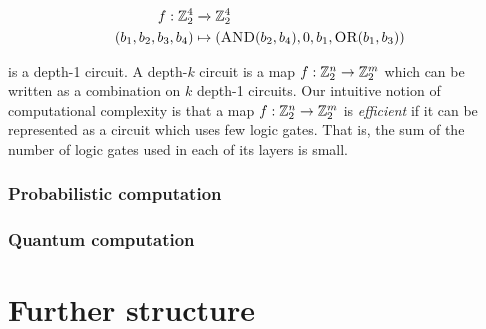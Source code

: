\documentclass{article}
\theoremstyle{definition}
\numberwithin{figure}{section}
\begin{document}
\begin{align*}
f:\mathbb{Z}_2^4&\xrightarrow{} \mathbb{Z}_2^4\\
(b_1,b_2,b_3,b_4)&\mapsto (\text{\scshape AND\normalfont}(b_2,b_4), 0, b_1, \text{\scshape OR\normalfont}(b_1,b_3))
\end{align*}

is a depth-1 circuit. A depth-$k$ circuit is a map $f:\mathbb{Z}_2^n\to \mathbb{Z}_2^m$ which can be written as a combination on $k$ depth-1 circuits. Our intuitive notion of computational complexity is that a map $f:\mathbb{Z}_2^n\to \mathbb{Z}_2^m$ is \textit{efficient} if it can be represented as a circuit which uses few logic gates. That is, the sum of the number of logic gates used in each of its layers is small.

\subsubsection{Probabilistic computation}

\subsubsection{Quantum computation}

\section{Further structure}



\end{document}
